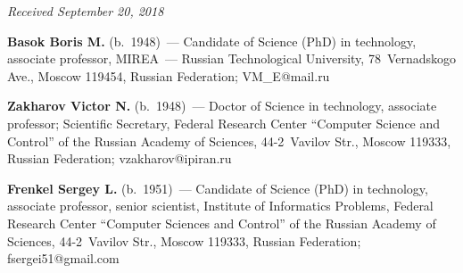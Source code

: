 \vspace*{-6pt}

\hfill{\small\textit{Received September 20, 2018}}


\vspace*{-24pt}
      
    
    \Contr
    
\noindent
\textbf{Basok Boris M.} (b.\ 1948)~--- Candidate of Science (PhD) in technology, associate professor, 
MIREA~--- Russian Technological University, 78~Vernadskogo Ave., Moscow 119454, Russian Federation; 
\mbox{VM\_E@mail.ru} 


\noindent
\textbf{Zakharov Victor N.} (b.\ 1948)~--- Doctor of Science in technology, associate professor; Scientific 
Secretary, Federal Research Center ``Computer Science and Control'' of the Russian Academy of Sciences, 
44-2~Vavilov Str., Moscow 119333, Russian Federation; \mbox{vzakharov@ipiran.ru}



\noindent
\textbf{Frenkel Sergey L.} (b.\ 1951)~--- Candidate of Science (PhD) in technology, associate professor, 
senior scientist, Institute of Informatics Problems, Federal Research Center ``Computer Sciences and Control'' 
of the Russian Academy of Sciences, 44-2~Vavilov Str., Moscow 119333, Russian Federation; 
fsergei51@gmail.com 

    
\label{end\stat}

\renewcommand{\bibname}{\protect\rm Литература}  